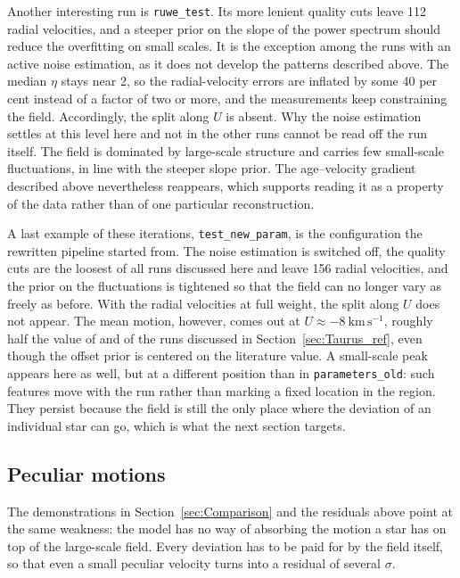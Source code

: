 Another interesting run is \texttt{ruwe\_test}. Its more lenient quality cuts leave 112 radial velocities, and a
steeper prior on the slope of the power spectrum should reduce the overfitting on small scales. It is the
exception among the runs with an active noise estimation, as it does not develop the patterns described
above. The median $\eta$ stays near 2, so the radial-velocity errors are inflated by some 40 per cent
instead of a factor of two or more, and the measurements keep constraining the field. Accordingly, the split along
$U$ is absent. Why the noise estimation settles at this level here and not in the other runs cannot be read
off the run itself. The field is dominated by large-scale structure and carries few small-scale
fluctuations, in line with the steeper slope prior. The age--velocity gradient described above nevertheless
reappears, which supports reading it as a property of the data rather than of one particular reconstruction.

A last example of these iterations, \texttt{test\_new\_param}, is the configuration the rewritten pipeline
started from. The noise estimation is switched off, the quality cuts are the
loosest of all runs discussed here and leave 156 radial velocities, and the prior on the fluctuations is
tightened so that the field can no longer vary as freely as before. With the radial velocities at full weight, the split along $U$ does
not appear. The mean motion, however, comes out at $U \approx -8~\mathrm{km\,s^{-1}}$, roughly half the
value of \citet{Galli2019} and of the runs discussed in Section~\ref{sec:Taurus_ref}, even though the
offset prior is centered on the literature value. A small-scale peak appears here as well, but at a
different position than in \texttt{parameters\_old}: such features move with the run rather than marking a
fixed location in the region. They persist because the field is still the only place where the deviation
of an individual star can go, which is what the next section targets.

\subsection{Peculiar motions}
\label{sec:peculiar_motions}

The demonstrations in Section~\ref{sec:Comparison} and the residuals above point at the same
weakness: the model has no way of absorbing the motion a star has on top of the large-scale
field. Every deviation has to be paid for by the field itself, so that even a small peculiar velocity turns
into a residual of several $\sigma$.

